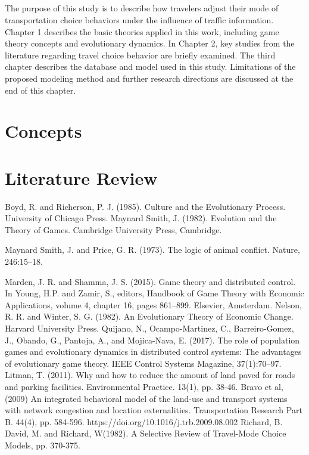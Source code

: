\documentclass[12pt]{report}
\begin{document}
\paragraph{}The purpose of this study is to describe how travelers adjust their mode of transportation choice behaviors under the influence of traffic information. Chapter 1 describes the basic theories applied in this work, including game theory concepts and evolutionary dynamics. In Chapter 2, key studies from the literature regarding travel choice behavior are briefly examined. The third chapter describes the database and model used in this study. Limitations of the proposed modeling method and further research directions are discussed at the end of this chapter. 
\thispagestyle{empty}

\chapter{Concepts}\setcounter{page}{1}\thispagestyle{empty}

\chapter{Literature Review} 


\begin{thebibliography}{2}
Boyd, R. and Richerson, P. J. (1985). Culture and the Evolutionary Process. University of Chicago Press.
Maynard Smith, J. (1982). Evolution and the Theory of Games. Cambridge University Press, Cambridge.

Maynard Smith, J. and Price, G. R. (1973). The logic of animal conflict. Nature, 246:15–18. 

Marden, J. R. and Shamma, J. S. (2015). Game theory and distributed control. In Young, H.P. and Zamir, S., editors, Handbook of Game Theory with Economic Applications, volume 4, chapter 16, pages 861–899. Elsevier, Amsterdam.
Nelson, R. R. and Winter, S. G. (1982). An Evolutionary Theory of Economic Change. Harvard University Press.
Quijano, N., Ocampo-Martinez, C., Barreiro-Gomez, J., Obando, G., Pantoja, A., and Mojica-Nava, E. (2017). The role of population games and evolutionary dynamics in distributed control systems: The advantages of evolutionary game theory. IEEE Control Systems Magazine, 37(1):70–97.
Litman, T. (2011). Why and how to reduce the amount of land paved for roads
and parking facilities. Environmental Practice. 13(1), pp. 38-46.
Bravo et al, (2009) An integrated behavioral model of the land-use and transport systems with network congestion and location externalities. Transportation Research Part B. 44(4), pp. 584-596.
https://doi.org/10.1016/j.trb.2009.08.002
Richard, B. David, M. and Richard, W(1982). A Selective Review of Travel-Mode Choice Models, pp. 370-375.
\end{thebibliography}
\end{document}
